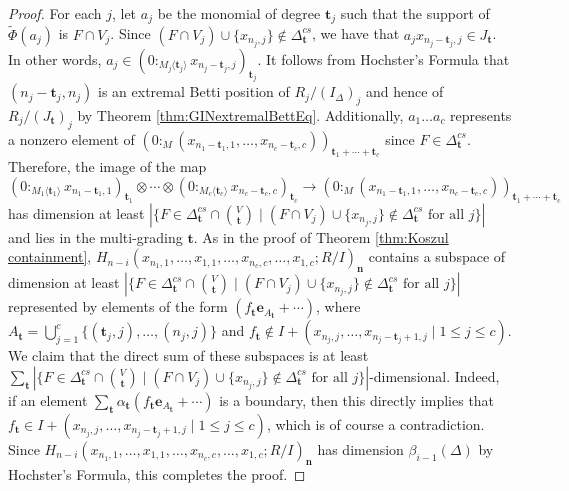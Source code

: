 \documentclass[a4paper, 10pt, reqno, english, ones]{amsart}  %
\theoremstyle{definition}
\theoremstyle{remark}
\begin{document}
\begin{proof}
    For each $j$, let $a_j$ be the monomial of degree $\mathbf{t}_j$ such that the support of $\tilde{\Phi}(a_j)$ is $F\cap V_j$. Since $(F\cap V_j)\cup \{x_{n_j,j}\}\notin \Delta_{\mathbf{t}}^{cs}$, we have that $a_jx_{n_j-\mathbf{t}_j,j}\in J_{\mathbf{t}}$. In other words, $a_j\in (0:_{M_{j}\langle \mathbf{t}_j \rangle}x_{n_j-\mathbf{t}_j,j})_{\mathbf{t}_{j}}$. It follows from Hochster's Formula that $(n_j-\mathbf{t}_j,n_j)$ is an extremal Betti position of $R_j/(I_\Delta)_j$ and hence of $R_j/(J_{\mathbf{t}})_j$ by Theorem \ref{thm:GINextremalBettEq}. Additionally, $a_1\dots a_c$ represents a nonzero element of $(0:_{M} (x_{n_1-\mathbf{t}_1,1},\dots,x_{n_c-\mathbf{t}_c,c}))_{\mathbf{t}_{1}+\cdots +\mathbf{t}_{c}}$ since $F\in \Delta_{\mathbf{t}}^{cs}$. Therefore, the image of the map
    \[
    (0:_{M_{1}\langle \mathbf{t}_1 \rangle}x_{n_1-\mathbf{t}_1,1})_{\mathbf{t}_{1}}\otimes \cdots \otimes (0:_{M_{c}\langle \mathbf{t}_c \rangle}x_{n_c-\mathbf{t}_c,c})_{\mathbf{t}_{c}} \longrightarrow (0:_{M} (x_{n_1-\mathbf{t}_1,1},\dots,x_{n_c-\mathbf{t}_c,c}))_{\mathbf{t}_{1}+\cdots +\mathbf{t}_{c}}
    \]
    has dimension at least $\left|\{ F\in \Delta_{\mathbf{t}}^{cs}\cap {V \choose \mathbf{t}} \mid (F\cap V_j)\cup \{x_{n_j,j}\}\notin \Delta_{\mathbf{t}}^{cs} \textrm{ for all } j \} \right|$ and lies in the multi-grading $\mathbf{t}$. As in the proof of Theorem \ref{thm:Koszul containment}, $H_{n-i}(x_{n_1,1},\dots,x_{1,1},\dots,x_{n_c,c},\dots,x_{1,c};R/I)_{\mathbf{n}}$ contains a subspace of dimension at least $\left|\{ F\in \Delta_{\mathbf{t}}^{cs}\cap {V \choose \mathbf{t}} \mid (F\cap V_j)\cup \{x_{n_j,j}\}\notin \Delta_{\mathbf{t}}^{cs} \textrm{ for all } j \} \right|$ represented by elements of the form $(f_{\mathbf{t}}\mathbf{e}_{A_{\mathbf{t}}}+\cdots)$, where $A_{\mathbf{t}}=\bigcup_{j=1}^c \{ (\mathbf{t}_j,j),\dots,(n_j,j)\}$ and $f_{\mathbf{t}}\notin I + (x_{n_j,j},\dots,x_{n_j-\mathbf{t}_j+1,j}\mid 1\leq j\leq c)$. We claim that the direct sum of these subspaces is at least $\sum_{\mathbf{t}}\left|\{ F\in \Delta_{\mathbf{t}}^{cs}\cap {V \choose \mathbf{t}} \mid (F\cap V_j)\cup \{x_{n_j,j}\}\notin \Delta_{\mathbf{t}}^{cs} \textrm{ for all } j \} \right|$-dimensional. Indeed, if an element $\sum_{\mathbf{t}}\alpha_{\mathbf{t}}(f_{\mathbf{t}}\mathbf{e}_{A_{\mathbf{t}}}+\cdots)$ is a boundary, then this directly implies that $f_{\mathbf{t}}\in I + (x_{n_j,j},\dots,x_{n_j-\mathbf{t}_j+1,j}\mid 1\leq j\leq c)$, which is of course a contradiction. Since $H_{n-i}(x_{n_1,1},\dots,x_{1,1},\dots,x_{n_c,c},\dots,x_{1,c};R/I)_{\mathbf{n}}$ has dimension $\beta_{i-1}(\Delta)$ by Hochster's Formula, this completes the proof.
\end{proof}
\end{document}
